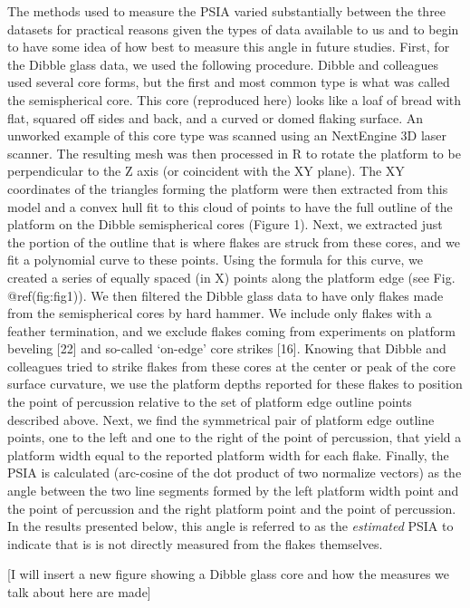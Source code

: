 \documentclass[10pt,letterpaper]{article}
\begin{document}
The methods used to measure the PSIA varied substantially between the
three datasets for practical reasons given the types of data available
to us and to begin to have some idea of how best to measure this angle
in future studies. First, for the Dibble glass data, we used the
following procedure. Dibble and colleagues used several core forms, but
the first and most common type is what was called the semispherical
core. This core (reproduced here) looks like a loaf of bread with flat,
squared off sides and back, and a curved or domed flaking surface. An
unworked example of this core type was scanned using an NextEngine 3D
laser scanner. The resulting mesh was then processed in R to rotate the
platform to be perpendicular to the Z axis (or coincident with the XY
plane). The XY coordinates of the triangles forming the platform were
then extracted from this model and a convex hull fit to this cloud of
points to have the full outline of the platform on the Dibble
semispherical cores (Figure 1). Next, we extracted just the portion of
the outline that is where flakes are struck from these cores, and we fit
a polynomial curve to these points. Using the formula for this curve, we
created a series of equally spaced (in X) points along the platform edge
(see Fig. @ref(fig:fig1)). We then filtered the Dibble glass data to
have only flakes made from the semispherical cores by hard hammer. We
include only flakes with a feather termination, and we exclude flakes
coming from experiments on platform beveling {[}22{]} and so-called
`on-edge' core strikes {[}16{]}. Knowing that Dibble and colleagues
tried to strike flakes from these cores at the center or peak of the
core surface curvature, we use the platform depths reported for these
flakes to position the point of percussion relative to the set of
platform edge outline points described above. Next, we find the
symmetrical pair of platform edge outline points, one to the left and
one to the right of the point of percussion, that yield a platform width
equal to the reported platform width for each flake. Finally, the PSIA
is calculated (arc-cosine of the dot product of two normalize vectors)
as the angle between the two line segments formed by the left platform
width point and the point of percussion and the right platform point and
the point of percussion. In the results presented below, this angle is
referred to as the \emph{estimated} PSIA to indicate that is is not
directly measured from the flakes themselves.

{[}I will insert a new figure showing a Dibble glass core and how the
measures we talk about here are made{]}
\end{document}
